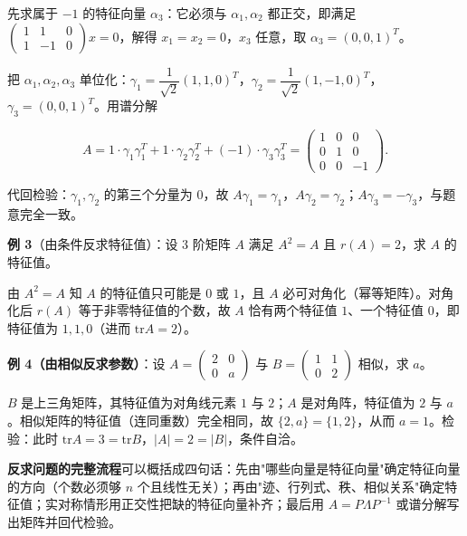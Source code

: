 \documentclass[11pt,openany,UTF8]{ctexbook}
\begin{document}
先求属于 $-1$ 的特征向量 $\alpha_3$：它必须与 $\alpha_1,\alpha_2$ 都正交，即满足 $\begin{pmatrix}1&1&0\\1&-1&0\end{pmatrix}x=0$，解得 $x_1=x_2=0$，$x_3$ 任意，取 $\alpha_3=(0,0,1)^T$。

把 $\alpha_1,\alpha_2,\alpha_3$ 单位化：$\gamma_1=\dfrac{1}{\sqrt2}(1,1,0)^T$，$\gamma_2=\dfrac{1}{\sqrt2}(1,-1,0)^T$，$\gamma_3=(0,0,1)^T$。用谱分解

\[A=1\cdot\gamma_1\gamma_1^T+1\cdot\gamma_2\gamma_2^T+(-1)\cdot\gamma_3\gamma_3^T =\begin{pmatrix}1&0&0\\0&1&0\\0&0&-1\end{pmatrix}.\]

代回检验：$\gamma_1,\gamma_2$ 的第三个分量为 $0$，故 $A\gamma_1=\gamma_1$，$A\gamma_2=\gamma_2$；$A\gamma_3=-\gamma_3$，与题意完全一致。

\textbf{例 3}（由条件反求特征值）：设 $3$ 阶矩阵 $A$ 满足 $A^2=A$ 且 $r(A)=2$，求 $A$ 的特征值。

由 $A^2=A$ 知 $A$ 的特征值只可能是 $0$ 或 $1$，且 $A$ 必可对角化（幂等矩阵）。对角化后 $r(A)$ 等于非零特征值的个数，故 $A$ 恰有两个特征值 $1$、一个特征值 $0$，即特征值为 $1,1,0$（进而 $\mathrm{tr}A=2$）。

\textbf{例 4（由相似反求参数）}：设 $A=\begin{pmatrix}2&0\\0&a\end{pmatrix}$ 与 $B=\begin{pmatrix}1&1\\0&2\end{pmatrix}$ 相似，求 $a$。

$B$ 是上三角矩阵，其特征值为对角线元素 $1$ 与 $2$；$A$ 是对角阵，特征值为 $2$ 与 $a$。相似矩阵的特征值（连同重数）完全相同，故 $\{2,a\}=\{1,2\}$，从而 $a=1$。检验：此时 $\mathrm{tr}A=3=\mathrm{tr}B$，$\vert A\vert=2=\vert B\vert$，条件自洽。

\textbf{反求问题的完整流程}可以概括成四句话：先由"哪些向量是特征向量"确定特征向量的方向（个数必须够 $n$ 个且线性无关）；再由"迹、行列式、秩、相似关系"确定特征值；实对称情形用正交性把缺的特征向量补齐；最后用 $A=P\Lambda P^{-1}$ 或谱分解写出矩阵并回代检验。
\end{document}
